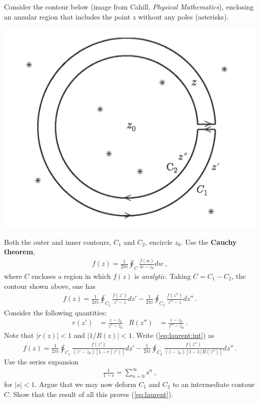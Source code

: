 \documentclass[12pt]{article}
\numberwithin{equation}{section}    %
\begin{document}
Consider the contour below (image from Cahill, \emph{Physical Mathematics}), enclosing an annular region that includes the point $z$ without any poles (asterisks).
\begin{center}
\includegraphics[width=.5\textwidth]{Cahill_5_5}
\end{center}
Both the outer and inner contours, $C_1$ and $C_2$, encircle $z_0$. Use the \textbf{Cauchy theorem},
\begin{align}
	f(z) = \frac{1}{2\pi i} \oint_{C} \frac{f(w)}{w-z_0} dw \ ,
	\label{eq:laurent}
\end{align}
where $C$ encloses a region in which $f(z)$ is \emph{analytic}. Taking $C = C_1 - C_2$, the contour shown above, one has
\begin{align}
	f(z) = 
	\frac{1}{2\pi i} \oint_{C_1} \frac{f(z')}{z'-z} dz'
	-
	\frac{1}{2\pi i} \oint_{C_2} \frac{f(z'')}{z''-z} dz'' \ .
	\label{eq:laurent:int}
\end{align}
Consider the following quantities:
\begin{align}
	r(z') &= \frac{z-z_0}{z'-z_0}
	&
	R(z'') &= \frac{z - z_0}{z''-z_0} \ .
\end{align}
Note that $|r(z)| < 1$ and $|1/R(z)| < 1$. Write (\ref{eq:laurent:int}) as
\begin{align}
	f(z) = 
	\frac{1}{2\pi i} \oint_{C_1} \frac{f(z')}{(z'-z_0)\left[1-r(z')\right]} dz'
	-
	\frac{1}{2\pi i} \oint_{C_2} \frac{f(z'')}{(z-z_0)\left[1-1/R(z'')\right]} dz'' \ .
\end{align}
Use the series expansion
\begin{align}
	\frac{1}{1-s} = \sum_{n=0}^\infty s^n \ ,
\end{align}
for $|s|<1$. Argue that we may now deform $C_1$ and $C_2$ to an intermediate contour $C$. Show that the result of all this proves (\ref{eq:laurent}).
\end{document}
